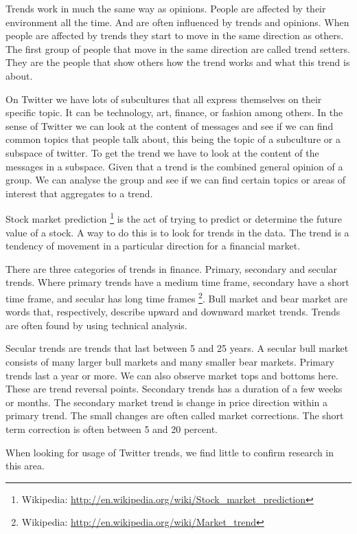 Trends work in much the same way as opinions. People are affected by their
environment all the time. And are often influenced by trends and opinions. When
people are affected by trends they start to move in the same direction as
others. The first group of people that move in the same
direction are called trend setters. They are the people that show others how
the trend works and what this trend is about. 

On Twitter we have lots of subcultures that all express themselves on their
specific topic. It can be technology, art, finance, or fashion among others.  
In the sense of Twitter we can look at the content of
messages and see if we can find common topics that people talk
about, this being the topic of a subculture or a subspace of twitter. To get
the trend we have to look at the content of the messages in a subspace. Given
that a trend is the combined general opinion of a group. We can analyse the
group and see if we can find certain topics or areas of interest that aggregates
to a trend.  

Stock market prediction
\footnote{Wikipedia: \url{http://en.wikipedia.org/wiki/Stock_market_prediction}}
is the act of trying to predict or determine the future
value of a stock. A way to do this is to look for trends in the data. The trend
is a tendency of movement in a particular direction for a financial market.

There are three categories of trends in finance. Primary, secondary and secular
trends. Where primary trends have a medium time frame, secondary have a short
time frame, and secular has long time frames \footnote{Wikipedia:
\url{http://en.wikipedia.org/wiki/Market_trend}}. Bull market and bear market
are words that, respectively, describe upward and downward market trends. 
Trends are often found by using technical analysis.  

Secular trends are trends that last between 5 and 25 years. A secular bull
market consists of many larger bull markets and many smaller bear markets.
Primary trends last a year or more. We can also observe market tops and
bottoms here. These are trend reversal points. Secondary trends has a
duration of a few weeks or months. The secondary market trend is change in
price direction within a primary trend. The small changes are often called
market corrections. The short term correction is often between 5 and 20 percent.

When looking for usage of Twitter trends, we find little to confirm research in
this area. 
%
